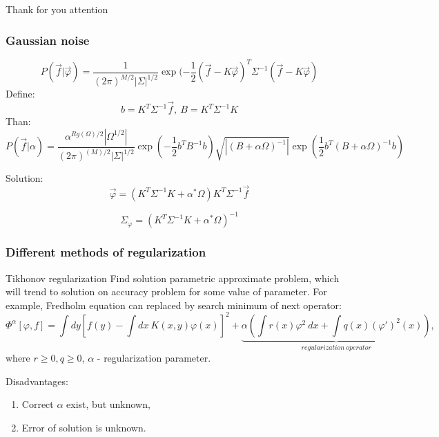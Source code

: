 \documentclass[8pt,pdf,hyperref={unicode}]{beamer}
\begin{document}
\begin{frame}
    \begin{center}
        \Large{Thank for you attention}
    \end{center}
\end{frame}




\begin{frame}
    \frametitle{Gaussian noise}
    $$
    P(\vec{f}|\vec{\varphi}) = \frac{1}{(2\pi)^{M/2}|\Sigma|^{1/2}} \exp(-\frac{1}{2}(\vec{f} - K\vec{\varphi})^T\Sigma^{-1}(\vec{f} - K\vec{\varphi})
    $$
    Define:
    $$
    b = K^T\Sigma^{-1}\vec{f},~ B = K^T\Sigma^{-1}K
    $$
    Than:
    $$
    P(\vec{f}|\alpha) = \frac{\alpha^{Rg(\Omega)/2}|\Omega^{1/2}|}{(2\pi)^{(M)/2}|\Sigma|^{1/2}}\exp(-\frac{1}{2}b^{T}B^{-1}b) \sqrt{|(B+\alpha\Omega)^{-1}|}\exp(\frac{1}{2}b^{T}(B+\alpha\Omega)^{-1}b)
    $$
    \begin{block}{Solution:}
        $$
        \vec{\varphi}= (K^T\Sigma^{-1}K+\alpha^*\Omega)K^T\Sigma^{-1}\vec{f}
        $$
        
        $$
        \Sigma_{\varphi} = (K^T\Sigma^{-1}K+\alpha^*\Omega)^{-1}
        $$
    \end{block}
\end{frame}

\begin{frame}
    \frametitle{Different methods of regularization}
    \begin{block}{Tikhonov regularization}
        {\LARGE Find solution parametric approximate problem, which will trend to solution on accuracy problem for some value of parameter. 
            For example, Fredholm equation can replaced by search minimum of next operator:}
        $$
        \varPhi^{\alpha}[\varphi,f] = \int dy\left[f(y) - \int dx~ K(x,y)\varphi(x)\right]^2 + 
        \underbrace{\alpha\left( \int r(x)\varphi^2~dx + \int q(x) (\varphi')^2(x)\right)}_{regularization~operator},
        $$
        where  $r \ge 0, q \ge 0$, $\alpha$ - regularization parameter.\\
    \end{block}

    \begin{block}{Disadvantages:}
        \begin{enumerate}
            \item Correct $\alpha$ exist, but unknown, 
            \item Error of solution is unknown.
        \end{enumerate}
    \end{block}
\end{frame}
\end{document}
